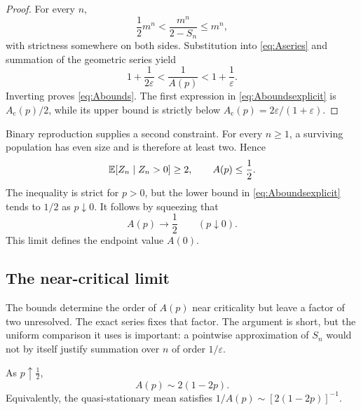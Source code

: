 \begin{proof}
For every \(n\),
\[
  \frac12m^n<\frac{m^n}{2-S_n}\leq m^n,
\]
with strictness somewhere on both sides.  Substitution into
\eqref{eq:Aseries} and summation of the geometric series yield
\[
  1+\frac{1}{2\varepsilon}
  <\frac1{A(p)}<
  1+\frac1{\varepsilon}.
\]
Inverting proves \eqref{eq:Abounds}.  The first expression in
\eqref{eq:Aboundsexplicit} is \(A_{\mathrm c}(p)/2\), while its upper bound is
strictly below \(A_{\mathrm c}(p)=2\varepsilon/(1+\varepsilon)\).
\end{proof}

Binary reproduction supplies a second constraint.  For every \(n\geq1\), a
surviving population has even size and is therefore at least two.  Hence
\begin{equation}
  \mathbb{E}[Z_n\mid Z_n>0]\geq2,
  \qquad
  A(p)\leq\frac12.
  \label{eq:parity-bound}
\end{equation}
The inequality is strict for \(p>0\), but the lower bound in
\eqref{eq:Aboundsexplicit} tends to \(1/2\) as \(p\downarrow0\).  It follows by
squeezing that
\begin{equation}
  A(p)\longrightarrow\frac12
  \qquad (p\downarrow0).
  \label{eq:A-at-zero}
\end{equation}
This limit defines the endpoint value \(A(0)\).

\subsection{The near-critical limit}
\label{sec:asymptotic}

The bounds determine the order of \(A(p)\) near criticality but leave a factor of
two unresolved.  The exact series fixes that factor.  The argument is short, but
the uniform comparison it uses is important: a pointwise approximation of
\(S_n\) would not by itself justify summation over \(n\) of order
\(1/\varepsilon\).

\begin{theorem}
As \(p\uparrow\tfrac12\),
\begin{equation}
  A(p)\sim2(1-2p).
  \label{eq:Aasym}
\end{equation}
Equivalently, the quasi-stationary mean satisfies
\(
  1/A(p)\sim[2(1-2p)]^{-1}.
\)
\end{theorem}

